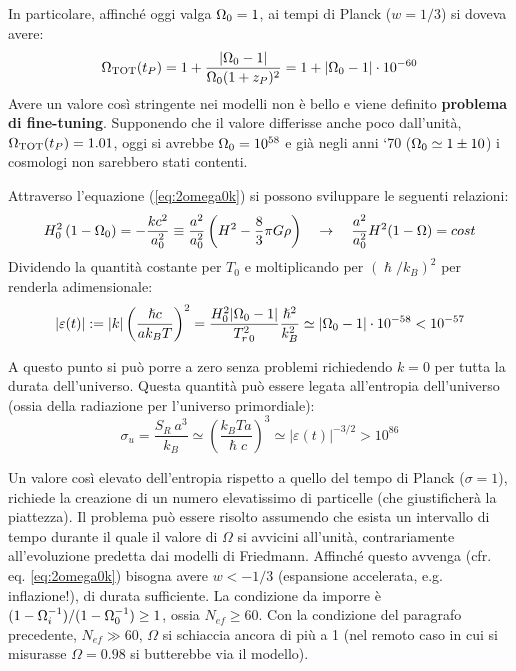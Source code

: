 In particolare, affinché oggi valga $\Omega_0=1$, ai tempi di Planck ($w=1/3$) si doveva avere:
$$
    \Omega_{\mathrm{TOT}} (t_P) = 1+\frac{ \left| \Omega_0 -1 \right|}{\Omega_0(1+z_P)^2} = 1 + \left| \Omega_0 -1 \right|\cdot 10^{-60}
$$
Avere un valore così stringente nei modelli non è bello e viene definito \textbf{problema di fine-tuning}. Supponendo che il valore differisse anche poco dall'unità, $\Omega_{\mathrm{TOT}} (t_P) =1.01$, oggi si avrebbe $\Omega_0=10^{58}$ e già negli anni `70 ($\Omega_0\simeq 1 \pm 10$) i cosmologi non sarebbero stati contenti.

Attraverso l'equazione (\ref{eq:2omega0k}) si possono sviluppare le seguenti relazioni:
\begin{equation}
    H_0^2 \left ( 1-\Omega_0 \right ) = -\frac{kc^2}{a_0^2} \equiv \frac{a^2}{a_0^2} \left( H^2 - \frac{8}{3}\pi G \rho\right) \quad \rightarrow \quad \frac{a^2}{a_0^2} H^2 (1-\Omega) = cost
\end{equation}
Dividendo la quantità costante per $T_0$ e moltiplicando per $(\hslash /k_B)^2$ per renderla adimensionale:
\begin{equation}
    |\varepsilon (t) | := |k| \left( \frac{\hslash c}{a k_B T}\right)^2 = \frac{H_0^2 |\Omega_0 -1|}{T_{r\, 0}^2}\frac{\hslash^2}{k_B^2} \simeq | \Omega_0 -1 | \cdot 10^{-58} < 10^{-57}
\end{equation}

A questo punto si può porre a zero senza problemi richiedendo $k=0$ per tutta la durata dell'universo. Questa quantità può essere legata all'entropia dell'universo (ossia della radiazione per l'universo primordiale):
\begin{equation}
    \sigma_u = \frac{S_R ~a^3}{k_B} \simeq \left( \frac{k_B Ta}{\hslash c} \right)^3 \simeq |\varepsilon (t) |^{-3/2} > 10^{86}
\end{equation}

Un valore così elevato dell'entropia rispetto a quello del tempo di Planck ($\sigma=1$), richiede la creazione di un numero elevatissimo di particelle (che giustificherà la piattezza). 
Il problema può essere risolto assumendo che esista un intervallo di tempo durante il quale il valore di $\Omega$ si avvicini all'unità, contrariamente all'evoluzione predetta dai modelli di Friedmann. Affinché questo avvenga (cfr. eq. \ref{eq:2omega0k}) bisogna avere $w<-1/3$ (espansione accelerata, e.g. inflazione!), di durata sufficiente. La condizione da imporre è $(1-\Omega_i^{-1})/(1-\Omega_0^{-1})\ge 1$, ossia $N_{ef}\ge 60$. Con la condizione del paragrafo precedente,  $N_{ef}\gg 60$, $\Omega$ si schiaccia ancora di più a 1 (nel remoto caso in cui si misurasse $\Omega=0.98$ si butterebbe via il modello).

